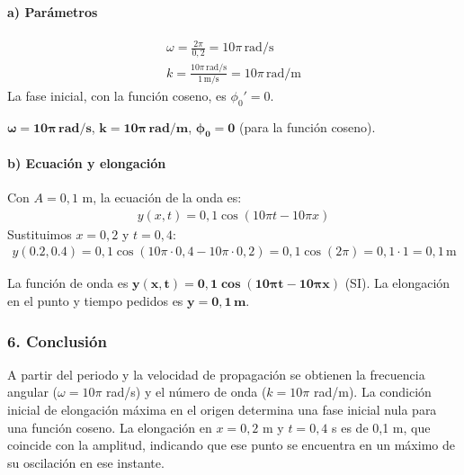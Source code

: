 \paragraph*{a) Parámetros}
\begin{gather}
    \omega = \frac{2\pi}{0,2} = 10\pi \, \text{rad/s} \\
    k = \frac{10\pi \, \text{rad/s}}{1\,\text{m/s}} = 10\pi \, \text{rad/m}
\end{gather}
La fase inicial, con la función coseno, es $\phi_0'=0$.
\begin{cajaresultado}
    $\boldsymbol{\omega = 10\pi\,\textbf{rad/s}}$, $\boldsymbol{k=10\pi\,\textbf{rad/m}}$, $\boldsymbol{\phi_0 = 0}$ (para la función coseno).
\end{cajaresultado}
\paragraph*{b) Ecuación y elongación}
Con $A=0,1$ m, la ecuación de la onda es:
\begin{gather}
    y(x,t) = 0,1 \cos(10\pi t - 10\pi x)
\end{gather}
Sustituimos $x=0,2$ y $t=0,4$:
\begin{gather}
    y(0.2, 0.4) = 0,1 \cos(10\pi \cdot 0,4 - 10\pi \cdot 0,2)  = 0,1 \cos(2\pi) = 0,1 \cdot 1 = 0,1\,\text{m}
\end{gather}
\begin{cajaresultado}
    La función de onda es $\boldsymbol{y(x,t) = 0,1 \cos(10\pi t - 10\pi x)}$ (SI). La elongación en el punto y tiempo pedidos es $\boldsymbol{y=0,1\,\textbf{m}}$.
\end{cajaresultado}

\subsubsection*{6. Conclusión}
\begin{cajaconclusion}
A partir del periodo y la velocidad de propagación se obtienen la frecuencia angular ($\omega=10\pi$ rad/s) y el número de onda ($k=10\pi$ rad/m). La condición inicial de elongación máxima en el origen determina una fase inicial nula para una función coseno. La elongación en $x=0,2$ m y $t=0,4$ s es de 0,1 m, que coincide con la amplitud, indicando que ese punto se encuentra en un máximo de su oscilación en ese instante.
\end{cajaconclusion}

\newpage

